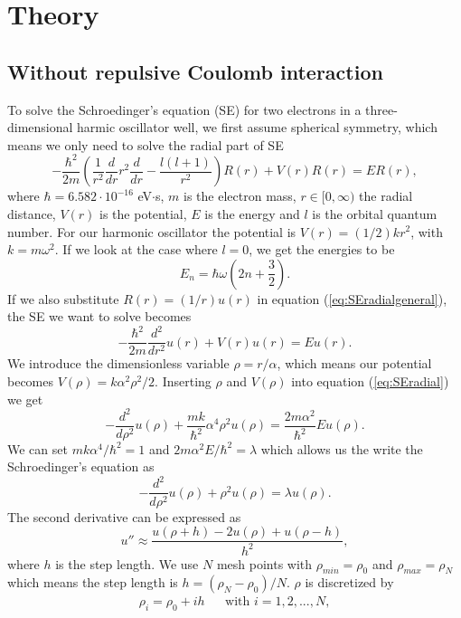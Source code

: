 \documentclass[norsk,a4paper,12pt]{article}
\begin{document}
\section{Theory}
\subsection{Without repulsive Coulomb interaction}
To solve the Schroedinger's equation (SE) for two electrons in a three-dimensional harmic oscillator well, we first assume spherical symmetry, which means we only need to solve the radial part of SE
\begin{equation}
-\frac{\hbar ^2}{2m}\left(\frac{1}{r^2}\frac{d}{dr}r^2\frac{d}{dr} - \frac{l(l+1)}{r^2}\right)R(r) + V(r)R(r) = ER(r),
\label{eq:SEradialgeneral}
\end{equation}
where $\hbar = 6.582 \cdot 10^{-16}$ eV$\cdot$s, $m$ is the electron mass, $r \in [0,\infty)$ the radial distance, $V(r)$ is the potential, $E$ is the energy and $l$ is the orbital quantum number. For our harmonic oscillator the potential is $V(r) = (1/2)kr^2$, with $k=m\omega ^2$. If we look at the case where $l=0$, we get the energies to be $$E_n = \hbar \omega \left(2n + \frac{3}{2}\right).$$ If we also substitute $R(r) = (1/r)u(r)$ in equation (\ref{eq:SEradialgeneral}), the SE we want to solve becomes 
\begin{equation}
-\frac{\hbar ^2}{2m}\frac{d^2}{dr^2} u(r) + V(r) u(r) = Eu(r).
\label{eq:SEradial}
\end{equation}
We introduce the dimensionless variable $\rho = r/\alpha$, which means our potential becomes $V(\rho)= k\alpha ^2 \rho ^2 / 2$. Inserting $\rho$ and $V(\rho)$ into equation (\ref{eq:SEradial}) we get
$$-\frac{d^2}{d\rho ^2}u(\rho) + \frac{mk}{\hbar ^2}\alpha ^4 \rho^2 u(\rho) = \frac{2m\alpha ^2}{\hbar^2}Eu(\rho).$$
We can set $mk\alpha^4/\hbar^2 = 1$ and $2m\alpha^2E/\hbar^2 = \lambda$ which allows us the write the Schroedinger's equation as \begin{equation}
-\frac{d^2}{d\rho ^2}u(\rho) + \rho ^2 u(\rho) = \lambda u(\rho).
\label{eq:SEdimless}
\end{equation}
The second derivative can be expressed as $$u'' \approx \frac{u(\rho + h) - 2u(\rho) + u(\rho -h)}{h^2},$$ where $h$ is the step length. We use $N$ mesh points with $\rho_{min} = \rho_0$ and $\rho_{max} = \rho_N$ which means the step length is $h = (\rho_N - \rho_0)/N$. $\rho$ is discretized by 
\begin{align*}
\rho_i  = \rho _0 + ih && \text{with }i = 1,2,...,N,
\end{align*}
\end{document}
